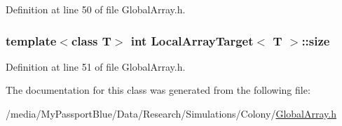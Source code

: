 \-Definition at line 50 of file \-Global\-Array.\-h.

\hypertarget{class_local_array_target_a86568f7d95eb26314a5856799071dc2e}{
\subsubsection[{size}]{\setlength{\rightskip}{0pt plus 5cm}template$<$class \-T$>$ int {\bf \-Local\-Array\-Target}$<$ \-T $>$\-::{\bf size}}}\label{class_local_array_target_a86568f7d95eb26314a5856799071dc2e}


\-Definition at line 51 of file \-Global\-Array.\-h.



\-The documentation for this class was generated from the following file\-:\begin{DoxyCompactItemize}
\item 
/media/\-My\-Passport\-Blue/\-Data/\-Research/\-Simulations/\-Colony/\hyperlink{_global_array_8h}{\-Global\-Array.\-h}\end{DoxyCompactItemize}
